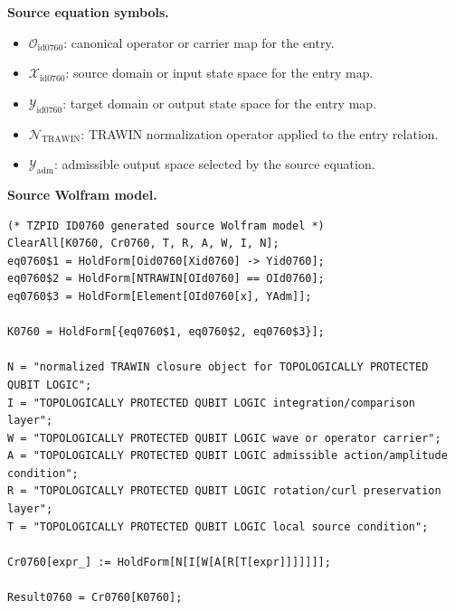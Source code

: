 \begin{minipage}[t]{0.49\linewidth}
\begingroup
\small
\raggedright
\textbf{Source equation symbols.}\par
\begin{itemize}[leftmargin=1.35em,itemsep=1pt,topsep=1pt,parsep=0pt]
    \item $\mathcal{O}_{\mathrm{id0760}}$: canonical operator or carrier map for the entry.
    \item $\mathcal{X}_{\mathrm{id0760}}$: source domain or input state space for the entry map.
    \item $\mathcal{Y}_{\mathrm{id0760}}$: target domain or output state space for the entry map.
    \item $\mathcal{N}_{\mathrm{TRAWIN}}$: TRAWIN normalization operator applied to the entry relation.
    \item $\mathcal{Y}_{\mathrm{adm}}$: admissible output space selected by the source equation.
\end{itemize}
\endgroup
\end{minipage}\hfill
\begin{minipage}[t]{0.47\linewidth}
\begingroup
\scriptsize
\raggedright
\textbf{Source Wolfram model.}\par
\begin{Verbatim}[fontsize=\tiny,breaklines=true,breakanywhere=true]
(* TZPID ID0760 generated source Wolfram model *)
ClearAll[K0760, Cr0760, T, R, A, W, I, N];
eq0760$1 = HoldForm[Oid0760[Xid0760] -> Yid0760];
eq0760$2 = HoldForm[NTRAWIN[OId0760] == OId0760];
eq0760$3 = HoldForm[Element[OId0760[x], YAdm]];

K0760 = HoldForm[{eq0760$1, eq0760$2, eq0760$3}];

N = "normalized TRAWIN closure object for TOPOLOGICALLY PROTECTED QUBIT LOGIC";
I = "TOPOLOGICALLY PROTECTED QUBIT LOGIC integration/comparison layer";
W = "TOPOLOGICALLY PROTECTED QUBIT LOGIC wave or operator carrier";
A = "TOPOLOGICALLY PROTECTED QUBIT LOGIC admissible action/amplitude condition";
R = "TOPOLOGICALLY PROTECTED QUBIT LOGIC rotation/curl preservation layer";
T = "TOPOLOGICALLY PROTECTED QUBIT LOGIC local source condition";

Cr0760[expr_] := HoldForm[N[I[W[A[R[T[expr]]]]]]];

Result0760 = Cr0760[K0760];
\end{Verbatim}
\endgroup
\end{minipage}

